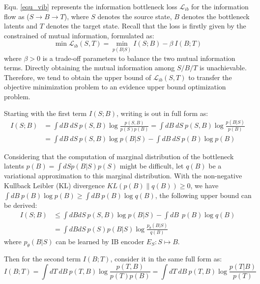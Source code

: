 \documentclass{article}
\begin{document}
Equ. \ref{equ_vib} represents the information bottleneck loss $\mathcal{L}_{ib}$ for the information flow as ($S\rightarrow B\rightarrow T$), where $S$ denotes the source state, $B$ denotes the bottleneck latents and $T$ denotes the target state. Recall that the loss is firstly given by the constrained of mutual information, formulated as:
\begin{equation}
    \min \mathcal{L}_{ib}(S,T) = \min_{p(B|S)} I(S;B) - \beta\ I(B;T)
\end{equation}
where $\beta>0$ is a trade-off parameters to balance the two mutual information terms. Directly obtaining the mutual information among $S/B/T$ is unachievable. Therefore, we tend to obtain the upper bound of $\mathcal{L}_{ib}(S,T)$ to transfer the objective minimization problem to an evidence upper bound optimization problem.

Starting with the first term $I(S;B)$, writing is out in full form as:
\begin{equation}
\begin{aligned}
    I(S;B) &= \int dB\ dS\ p(S, B) \log{\frac{p(S, B)}{p(S)p(B)}} = \int dB\ dS\ p(S, B) \log{\frac{p(B|S)}{p(B)}} \\
    & = \int dB\ dS\ p(S, B) \log{p(B|S)} - \int dB\ dS\ p(B) \log{p(B)} 
\end{aligned}
\end{equation}

Considering that the computation of marginal distribution of the bottleneck latents $p(B)=\int{dS p(B|S)p(S)}$ might be difficult, let $q(B)$ be a variational approximation to this marginal distribution. With the non-negative Kullback Leibler (KL) divergence $KL(p(B)\parallel q(B))\geq 0$, we have $\int dB\ p(B) \log{p(B)} \geq \int dB\ p(B) \log{q(B)}$, the following upper bound can be derived:
\begin{equation}
\begin{aligned}
    I(S;B) &\leq \int dBdS\ p(S, B) \log{p(B|S)} - \int dB\ \ p(B) \log{q(B)} \\
    &=\int dBdS\ p(S)p(B|S) \log{\frac{p_\theta(B|S)}{q(B)}} 
\end{aligned}
\end{equation}
where $p_\theta(B|S)$ can be learned by IB encoder $E_S:S\mapsto B$.

Then for the second term $I(B;T)$, consider it in the same full form as:
\begin{equation}
    I(B;T)= \int dT\ dB\ p(T,B) \log{\frac{p(T, B)}{p(T)p(B)}} = \int dT\ dB\ p(T, B) \log{\frac{p(T|B)}{p(T)}}
\end{equation}
\end{document}

